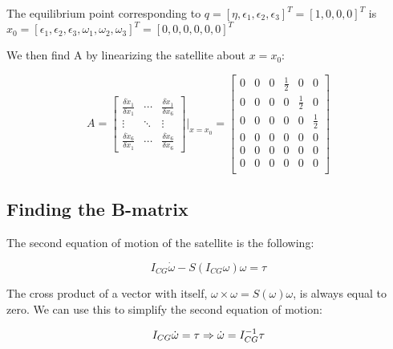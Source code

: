 The equilibrium point corresponding to $q = [\eta,\epsilon_1,\epsilon_2,\epsilon_3]^T = [1,0,0,0]^T$ is $x_0 = [\epsilon_1,\epsilon_2,\epsilon_3,\omega_1,\omega_2,\omega_3]^T = [0,0,0,0,0,0]^T$


We then find A by linearizing the satellite about $x = x_0$:

\begin{equation*}
    A =
    \begin{bmatrix}
        \frac{\delta\dot{x}_1}{\delta x_1}  &   \cdots  &   \frac{\delta\dot{x}_1}{\delta x_6}\\
        \vdots                              &   \ddots  &   \vdots\\
        \frac{\delta\dot{x}_6}{\delta x_1}  &   \cdots  &   \frac{\delta\dot{x}_6}{\delta x_6}
    \end{bmatrix}\Biggr|_{x=x_0}
    =
    \begin{bmatrix}
        0   &   0   &   0   &   \frac{1}{2} &   0           &   0\\
        0   &   0   &   0   &   0           &   \frac{1}{2} &   0\\
        0   &   0   &   0   &   0           &   0           &   \frac{1}{2}\\
        0   &   0   &   0   &   0           &   0           &   0\\
        0   &   0   &   0   &   0           &   0           &   0\\
        0   &   0   &   0   &   0           &   0           &   0\\
    \end{bmatrix}
\end{equation*}




\subsection{Finding the B-matrix}

The second equation of motion of the satellite is the following:

\begin{equation*}
    I_{CG}\dot{\omega} - S(I_{CG}\omega)\omega = \tau
\end{equation*}

The cross product of a vector with itself, $\omega\times\omega = S(\omega)\omega$, is always equal to zero. We can use this to simplify the second equation of motion:

\begin{equation*}
    I_{CG}\dot\omega = \tau\\
    \Rightarrow \dot\omega = I_{CG}^{-1}\tau
\end{equation*}

